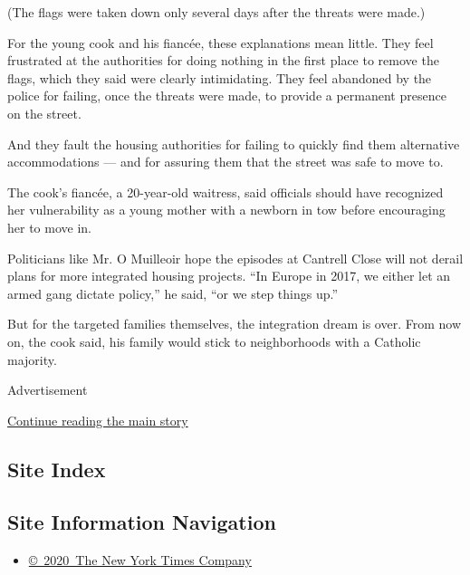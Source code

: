 (The flags were taken down only several days after the threats were
made.)

For the young cook and his fiancée, these explanations mean little. They
feel frustrated at the authorities for doing nothing in the first place
to remove the flags, which they said were clearly intimidating. They
feel abandoned by the police for failing, once the threats were made, to
provide a permanent presence on the street.

And they fault the housing authorities for failing to quickly find them
alternative accommodations --- and for assuring them that the street was
safe to move to.

The cook's fiancée, a 20-year-old waitress, said officials should have
recognized her vulnerability as a young mother with a newborn in tow
before encouraging her to move in.

Politicians like Mr. O Muilleoir hope the episodes at Cantrell Close
will not derail plans for more integrated housing projects. ``In Europe
in 2017, we either let an armed gang dictate policy,'' he said, ``or we
step things up.''

But for the targeted families themselves, the integration dream is over.
From now on, the cook said, his family would stick to neighborhoods with
a Catholic majority.

Advertisement

\protect\hyperlink{after-bottom}{Continue reading the main story}

\hypertarget{site-index}{%
\subsection{Site Index}\label{site-index}}

\hypertarget{site-information-navigation}{%
\subsection{Site Information
Navigation}\label{site-information-navigation}}

\begin{itemize}
\tightlist
\item
  \href{https://help.nytimes.com/hc/en-us/articles/115014792127-Copyright-notice}{©~2020~The
  New York Times Company}
\end{itemize}

